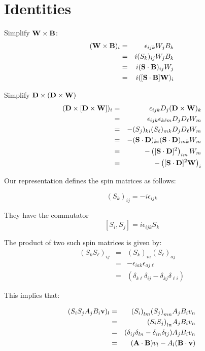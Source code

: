 \appendix






\chapter{Identities}

Simplify $ \mathbf{W} \times \mathbf{B}$:
\begin{eqnarray*}
(\mathbf{W} \times \mathbf{B})_i
	&=&	\epsilon_{ijk} W_j B_k	\\
	&=&	i(S_k)_{ij} W_j B_k\\
	&=&	i(\mathbf{S} \cdot \mathbf{B})_{ij} W_j	\\
	&=&	i([\mathbf{S} \cdot \mathbf{B}] \mathbf{W})_i
\end{eqnarray*}

Simplify $\mathbf{D} \times ( \mathbf{D} \times \mathbf{W} ) $
\begin{eqnarray*}
(\mathbf{D} \times [ \mathbf{D} \times \mathbf{W} ] )_i
	&=&	\epsilon_{ijk} D_j (\mathbf{D} \times \mathbf{W})_k	\\
	&=&	\epsilon_{ijk} \epsilon_{k\ell m} D_j D_\ell W_m	\\
	&=&	-(S_j)_{ki} (S_\ell)_{mk} D_j D_\ell W_m	\\
	&=&	-(\mathbf{S} \cdot \mathbf{D})_{ki} (\mathbf{S} \cdot \mathbf{D})_{mk} W_m	\\
	&=&	-\left( [\mathbf{S} \cdot \mathbf{D}]^2 \right)_{im} W_m	\\
	&=&	-\left( [\mathbf{S} \cdot \mathbf{D}]^2 \mathbf{W} \right)_i	\\
\end{eqnarray*}

Our representation defines the spin matrices as follows:

$${(S_k)}_{ij}=-i \epsilon_{ijk}$$

They have the commutator
$$	[S_i, S_j] = i \epsilon_{ijk} S_k $$

The product of two such spin matrices is given by:
\begin{eqnarray*}
{(S_k S_\ell)}_{ij} 
	& = & {(S_k)}_{ia} {(S_\ell)}_{aj} \\
	& = & -\epsilon_{iak} \epsilon_{aj\ell} \\
	& = & (\delta_{k\ell} \delta_{ij} - \delta_{kj} \delta_{\ell i} )
\end{eqnarray*}

This implies that:

\begin{eqnarray*}
(S_i S_j A_j B_i \mathbf{v} )_l 
	&=&  	{(S_i)}_{lm} {(S_j)}_{mn} A_j B_i v_n \\
	&=&	{(S_iS_j)}_{ln} A_j B_i v_n \\
	&=&	 (\delta_{ij} \delta_{ln} - \delta_{in} \delta_{lj} ) A_j B_i v_n \\
	&=&	(\mathbf{A} \cdot \mathbf{B}) v_l  - A_l ( \mathbf{B} \cdot \mathbf{v}) \\
\end{eqnarray*}

